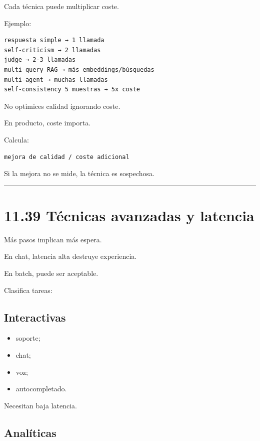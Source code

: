 Cada técnica puede multiplicar coste.

Ejemplo:

\begin{lstlisting}
respuesta simple → 1 llamada
self-criticism → 2 llamadas
judge → 2-3 llamadas
multi-query RAG → más embeddings/búsquedas
multi-agent → muchas llamadas
self-consistency 5 muestras → 5x coste
\end{lstlisting}

No optimices calidad ignorando coste.

En producto, coste importa.

Calcula:

\begin{lstlisting}
mejora de calidad / coste adicional
\end{lstlisting}

Si la mejora no se mide, la técnica es sospechosa.

\begin{center}\rule{0.5\linewidth}{0.5pt}\end{center}

\section{11.39 Técnicas avanzadas y
latencia}\label{tuxe9cnicas-avanzadas-y-latencia}

Más pasos implican más espera.

En chat, latencia alta destruye experiencia.

En batch, puede ser aceptable.

Clasifica tareas:

\subsection{Interactivas}\label{interactivas}

\begin{itemize}
\tightlist
\item
  soporte;
\item
  chat;
\item
  voz;
\item
  autocompletado.
\end{itemize}

Necesitan baja latencia.

\subsection{Analíticas}\label{analuxedticas}

